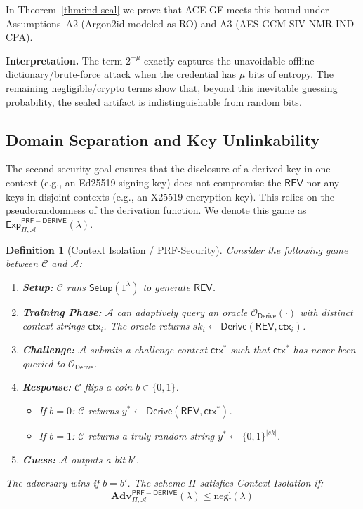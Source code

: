 \documentclass[12pt,a4paper]{article}
\newtheorem{definition}{Definition}
\begin{document}
  \noindent In Theorem~\ref{thm:ind-seal} we prove that ACE-GF meets this bound under Assumptions~A2 (Argon2id modeled as RO) and A3 (AES-GCM-SIV NMR-IND-CPA).

  \textbf{Interpretation.}
  The term $2^{-\mu}$ exactly captures the unavoidable offline dictionary/brute-force attack when the credential has $\mu$ bits of entropy. The remaining negligible/crypto terms show that, beyond this inevitable guessing probability, the sealed artifact is indistinguishable from random bits.

  \subsection{Domain Separation and Key Unlinkability}

  The second security goal ensures that the disclosure of a derived key in one context (e.g., an Ed25519 signing key) does not compromise the $\mathsf{REV}$ nor any keys in disjoint contexts (e.g., an X25519 encryption key). This relies on the pseudorandomness of the derivation function. We denote this game as $\mathsf{Exp}_{\Pi, \mathcal{A}}^{\mathsf{PRF-DERIVE}}(\lambda)$.

  \begin{definition}[Context Isolation / PRF-Security]
   Consider the following game between $\mathcal{C}$ and $\mathcal{A}$:
   \begin{enumerate}
  \item \textbf{Setup:} $\mathcal{C}$ runs $\mathsf{Setup}(1^\lambda)$ to generate $\mathsf{REV}$.
  \item \textbf{Training Phase:} $\mathcal{A}$ can adaptively query an oracle $\mathcal{O}_{\mathsf{Derive}}(\cdot)$ with distinct context strings $\mathsf{ctx}_i$. The oracle returns $sk_i \leftarrow \mathsf{Derive}(\mathsf{REV}, \mathsf{ctx}_i)$.
  \item \textbf{Challenge:} $\mathcal{A}$ submits a challenge context $\mathsf{ctx}^*$ such that $\mathsf{ctx}^*$ has never been queried to $\mathcal{O}_{\mathsf{Derive}}$.
  \item \textbf{Response:} $\mathcal{C}$ flips a coin $b \in \{0,1\}$.
  \begin{itemize}
    \item If $b=0$: $\mathcal{C}$ returns $y^* \leftarrow \mathsf{Derive}(\mathsf{REV}, \mathsf{ctx}^*)$.
    \item If $b=1$: $\mathcal{C}$ returns a truly random string $y^* \leftarrow \{0,1\}^{|sk|}$.
  \end{itemize}
  \item \textbf{Guess:} $\mathcal{A}$ outputs a bit $b'$.
   \end{enumerate}
   The adversary wins if $b = b'$. The scheme $\Pi$ satisfies \emph{Context Isolation} if:
   \[
  \mathbf{Adv}_{\Pi, \mathcal{A}}^{\mathsf{PRF-DERIVE}}(\lambda) \le \text{negl}(\lambda)
   \]
  \end{definition}
\end{document}
